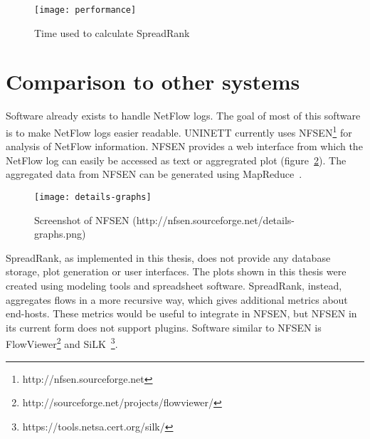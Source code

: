 \begin{figure}[h!]
	\caption{Time used to calculate SpreadRank}
	\label{fig:performance}
	\centering
		\texttt{[image: performance]}
\end{figure}


\section{Comparison to other systems}
Software already exists to handle NetFlow logs.
The goal of most of this software is to make NetFlow logs easier readable.
UNINETT currently uses NFSEN\footnote{http://nfsen.sourceforge.net} for analysis of NetFlow information.
NFSEN provides a web interface from which the NetFlow log can easily be accessed as text or aggregrated plot (figure~\ref{fig:details-graphs}).
The aggregated data from NFSEN can be generated using MapReduce~\cite{Morken352472}.

\begin{figure}[h!]
	\caption{Screenshot of NFSEN (http://nfsen.sourceforge.net/details-graphs.png)}
	\label{fig:details-graphs}
	\centering
		\texttt{[image: details-graphs]}
\end{figure}

SpreadRank, as implemented in this thesis, does not provide any database storage, plot generation or user interfaces.
The plots shown in this thesis were created using modeling tools and spreadsheet software.
SpreadRank, instead, aggregates flows in a more recursive way, which gives additional metrics about end-hosts.
These metrics would be useful to integrate in NFSEN, but NFSEN in its current form does not support plugins.
Software similar to NFSEN is FlowViewer\footnote{http://sourceforge.net/projects/flowviewer/} and SiLK~\footnote{https://tools.netsa.cert.org/silk/}.

